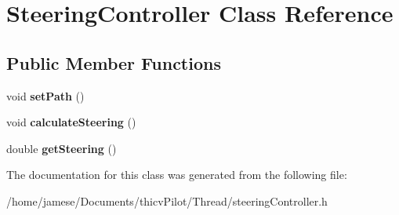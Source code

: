 \hypertarget{class_steering_controller}{}\section{Steering\+Controller Class Reference}
\label{class_steering_controller}
\subsection*{Public Member Functions}
\begin{DoxyCompactItemize}
\item 
\mbox{\label{class_steering_controller_a5d4099c8ccd9f8bddb0b5e34479bd21f}} 
void {\bfseries set\+Path} ()
\item 
\mbox{\label{class_steering_controller_a844ef6e8799dd86adf9bf972fd5ce479}} 
void {\bfseries calculate\+Steering} ()
\item 
\mbox{\label{class_steering_controller_aa0aeac42ac9f3b4cb26f723d12d822fb}} 
double {\bfseries get\+Steering} ()
\end{DoxyCompactItemize}


The documentation for this class was generated from the following file\+:\begin{DoxyCompactItemize}
\item 
/home/jamese/\+Documents/thicv\+Pilot/\+Thread/steering\+Controller.\+h\end{DoxyCompactItemize}
